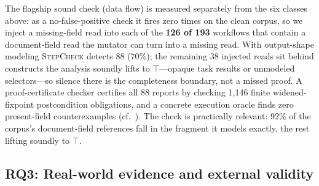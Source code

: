 The flagship sound check  (data flow) is measured separately from the six classes above:
as a no-false-positive check it fires zero times on the clean corpus, so we inject a missing-field read
into each of the \textbf{126 of 193} workflows that contain a document-field read the mutator can turn
into a missing read. 
With output-shape modeling \textsc{StepCheck} detects 88 (70\%); the
remaining 38 injected reads sit behind constructs the analysis soundly
lifts to $\top$---opaque task results or unmodeled
selectors---so silence there is the completeness boundary, not a missed proof. A proof-certificate checker certifies
all 88 reports by checking 1,146 finite widened-fixpoint postcondition
obligations, and a concrete execution oracle finds zero present-field
counterexamples (cf.~\cite{translationvalidation}). The check is practically relevant: 92\% of the corpus's
document-field references fall in the fragment it models exactly,
the rest lifting soundly to $\top$.



\subsection{RQ3: Real-world evidence and external validity}
\label{sec:eval:wild}
\label{sec:eval:cncf}

